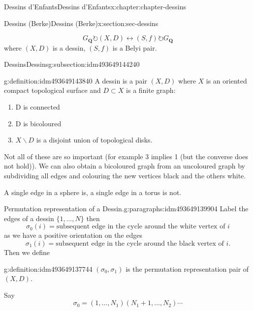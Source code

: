 \documentclass[oneside,10pt,]{book}
\numberwithin{equation}{section}
\newcommand{\QQ}{\mathbf{Q}}
\newcommand{\acts}{\circlearrowright}
\begin{document}
\begin{chapterptx}{Dessins d'Enfants}{}{Dessins d'Enfants}{}{}{x:chapter:chapter-dessins}
\begin{sectionptx}{Dessins (Berke)}{}{Dessins (Berke)}{}{}{x:section:sec-dessins}
\begin{introduction}{}%
%
\begin{equation*}
G_\QQ \acts (X,D) \leftrightarrow (S,f) \acts G_\QQ
\end{equation*}
where \((X,D)\) is a dessin, \((S,f)\) is a Belyi pair.%
\end{introduction}%
%
%
\typeout{************************************************}
\typeout{************************************************}
%
\begin{subsectionptx}{Dessins}{}{Dessins}{}{}{g:subsection:idm493649144240}
\begin{definition}{}{g:definition:idm493649143840}%
A dessin is  a pair \((X,D)\) where \(X\) is an oriented compact topological surface and \(D\subset X\) is a finite graph:%
\begin{enumerate}
\item{}D is connected%
\item{}D is bicoloured%
\item{}\(X \smallsetminus D\) is a disjoint union of topological disks.%
\end{enumerate}
%
\end{definition}
Not all of these are so important (for example 3 implies 1 (but the converse does not hold)). We can also obtain a bicoloured graph from an uncoloured graph by subdividing all edges and colouring the new vertices black and the others white.%
\par
A single edge in a sphere is, a single edge in a torus is not.%
\begin{paragraphs}{Permutation representation of a Dessin.}{g:paragraphs:idm493649139904}%
Label the edges of  a dessin \(\{1, \ldots, N\}\) then%
\begin{equation*}
\sigma_0(i) = \text{subsequent edge in the cycle around the white vertex of }i
\end{equation*}
as we have a positive orientation on the edges%
\begin{equation*}
\sigma_1(i) = \text{subsequent edge in the cycle around the black vertex of }i\text{.}
\end{equation*}
Then we define%
\begin{definition}{}{g:definition:idm493649137744}%
\((\sigma_0, \sigma_1)\) is the permutation representation pair of \((X,D)\).%
\end{definition}
Say%
\begin{equation*}
\sigma_0 = (1 , \ldots, N_1) (N_1 + 1 , \ldots, N_2)\cdots
\end{equation*}

\end{paragraphs}
\end{subsectionptx}
\end{sectionptx}
\end{chapterptx}
\end{document}
